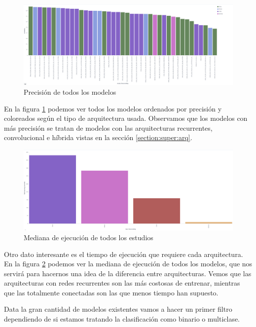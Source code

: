 \begin{figure}[!ht]
	\centering
	\includegraphics[width=1\textwidth]{images/super/resumen_todos}
	\caption{Precisión de todos los modelos}
	\label{fig:resumen_todos}
\end{figure}

En la figura \ref{fig:resumen_todos} podemos ver todos los modelos ordenados por precisión y coloreados según el tipo de arquitectura usada. Observamos que los modelos con más precisión se tratan de modelos con las arquitecturas recurrentes, convolucional e híbrida vistas en la sección \ref{section:super:arq}.



\begin{figure}[!ht]
	\centering
	\includegraphics[width=1\textwidth]{images/super/resumen_tiempo}
	\caption{Mediana de ejecución de todos los estudios}
	\label{fig:resumen_tiempo}
\end{figure}

Otro dato interesante es el tiempo de ejecución que requiere cada arquitectura. En la figura \ref{fig:resumen_tiempo} podemos ver la mediana de ejecución de todos los modelos, que nos servirá para hacernos una idea de la diferencia entre arquitecturas. Vemos que las arquitecturas con redes recurrentes son las más costosas de entrenar, mientras que las totalmente conectadas son las que menos tiempo han supuesto.

\FloatBarrier


Data la gran cantidad de modelos existentes vamos a hacer un primer filtro dependiendo de si estamos tratando la clasificación como binario o multiclase.

